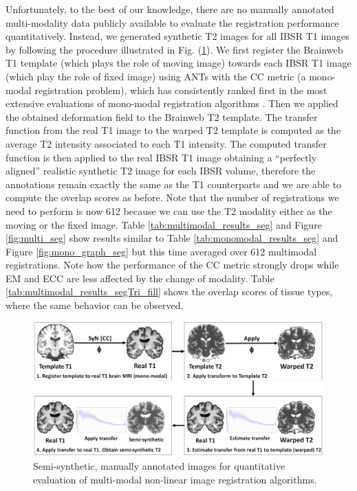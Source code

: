 Unfortunately, to the best of our knowledge, there are no manually annotated multi-modality data publicly available to evaluate the registration performance quantitatively. Instead, we generated synthetic T2 images for all IBSR T1 images by following the procedure illustrated in Fig. (\ref{fig:semi_synthetic_image_creation}). We first register the Brainweb T1 template (which plays the role of moving image) towards each IBSR T1 image (which play the role of fixed image) using ANTs with the CC metric (a mono-modal registration problem), which has consistently ranked first in the most extensive evaluations of mono-modal registration algorithms \citep{Klein2009, Klein2010, Rohlfing2012}. Then we applied the obtained deformation field to the Brainweb T2 template. The transfer function from the real T1 image to the warped T2 template is computed as the average T2 intensity associated to each T1 intensity. The computed transfer function is then applied to the real IBSR T1 image obtaining a ``perfectly aligned'' realistic synthetic T2 image for each IBSR volume, therefore the annotations remain exactly the same as the T1 counterparts and we are able to compute the overlap scores as before. Note that the number of registrations we need to perform is now 612 because we can use the T2 modality either as the moving or the fixed image. Table \ref{tab:multimodal_results_seg} and Figure \ref{fig:multi_seg} show results similar to Table \ref{tab:monomodal_results_seg} and Figure \ref{fig:mono_graph_seg} but this time averaged over 612 multimodal registrations. Note how the performance of the CC metric strongly drops while EM and ECC are less affected by the change of modality. Table \ref{tab:multimodal_results_segTri_fill} shows the overlap scores of tissue types, where the same behavior can be observed.\\

\pagebreak
\begin{figure}[t!]
\centering
    \includegraphics[width=\linewidth]{./images/semi_synthetic_image_creation.png}
    \caption{Semi-synthetic, manually annotated images for quantitative evaluation of multi-modal non-linear image registration algorithms.}
\label{fig:semi_synthetic_image_creation}
\end{figure}

